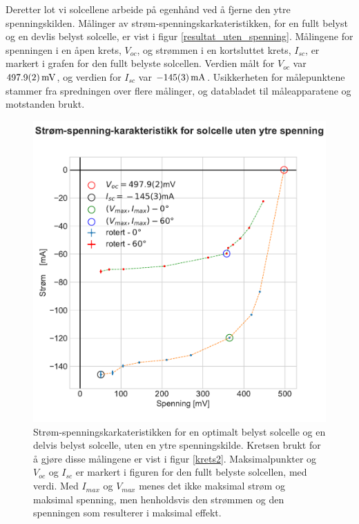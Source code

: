 \documentclass[%
 reprint,
 amsmath,amssymb,
 aps,
 norsk,
 booktabs
]{revtex4-1}
\begin{document}
Deretter lot vi solcellene arbeide på egenhånd ved å fjerne den ytre spenningskilden. Målinger av strøm-spenningskarkateristikken, for en fullt belyst og en devlis belyst solcelle, er vist i figur \vref{resultat_uten_spenning}. Målingene for spenningen i en åpen krets, $V_{oc}$, og strømmen i en kortsluttet krets, $I_{sc}$, er markert i grafen for den fullt belyste solcellen. Verdien målt for $V_{oc}$ var $\SI{497.9\pm0.2}{\milli\volt}$, og verdien for $I_{sc}$ var $\SI{-145\pm3}{\milli\ampere}$. Usikkerheten for målepunktene stammer fra spredningen over flere målinger, og databladet til måleapparatene og motstanden brukt. \\
\begin{figure}
  \centering
  \includegraphics[scale=0.45]{strom_spenning_karr_test.pdf}
  \caption{Strøm-spenningskarkateristikken for en optimalt belyst solcelle og en delvis belyst solcelle, uten en ytre spenningskilde. Kretsen brukt for å gjøre disse målingene er vist i figur \vref{krets2}. Maksimalpunkter og $V_{oc}$ og $I_{sc}$ er markert i figuren for den fullt belyste solcellen, med verdi. Med $I_{max}$ og $V_{max}$ menes det ikke maksimal strøm og maksimal spenning, men henholdsvis den strømmen og den spenningen som resulterer i maksimal effekt.}
  \label{resultat_uten_spenning}
\end{figure}
\end{document}
